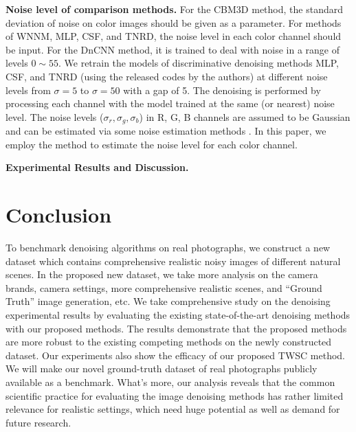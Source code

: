 \textbf{Noise level of comparison methods.} For the CBM3D method, the standard deviation of noise on color images should be given as a parameter. For methods of WNNM, MLP, CSF, and TNRD, the noise level in each color channel should be input. For the DnCNN method, it is trained to deal with noise in a range of levels $0\sim55$. We retrain the models of discriminative denoising methods MLP, CSF, and TNRD (using the released codes by the authors) at different noise levels from $\sigma=5$ to $\sigma=50$ with a gap of 5. The denoising is performed by processing each channel with the model trained at the same (or nearest) noise level. The noise levels ($\sigma_{r}, \sigma_{g}, \sigma_{b}$) in R, G, B channels are assumed to be Gaussian and can be estimated via some noise estimation methods \cite{noiselevel,Chen2015ICCV}. In this paper, we employ the method \cite{noiselevel} to estimate the noise level for each color channel.


\textbf{Experimental Results and Discussion.}





\section{Conclusion}

To benchmark denoising algorithms on real photographs, we construct a new dataset which contains comprehensive realistic noisy images of different natural scenes. In the proposed new dataset, we take more analysis on the camera brands, camera settings, more comprehensive realistic scenes, and ``Ground Truth'' image generation, etc. We take comprehensive study on the denoising experimental results by evaluating the existing state-of-the-art denoising methods with our proposed methods. The results demonstrate that the proposed methods are more robust to the existing competing methods on the newly constructed dataset. Our experiments also show the efficacy of our proposed TWSC method. We will make our novel ground-truth dataset of real photographs publicly available as a benchmark. What's more, our analysis reveals that the common scientific practice for evaluating the image denoising methods has rather limited relevance for realistic settings, which need huge potential as well as demand for future research.





















